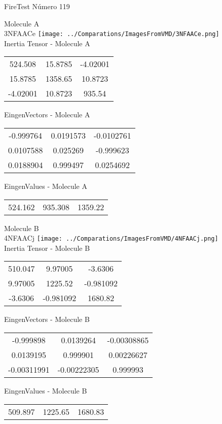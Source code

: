 \vtab[-2cm]
\begin{center}
{\large FireTest \tab Número 119}
\end{center}
\begin{multicols}{2}
\begin{center}

Molecule A \\ 
3NFAACe
\texttt{[image: ../Comparations/ImagesFromVMD/3NFAACe.png]}
\\
Inertia Tensor - Molecule A \\
\vtab

\begin{tabular}{|c c c|}
524.508	 & 	15.8785	 & 	-4.02001	 \\
15.8785	 & 	1358.65	 & 	10.8723	 \\
-4.02001	 & 	10.8723	 & 	935.54
\end{tabular}

\vtab
 EingenVectors - Molecule A     \\
\vtab
\begin{tabular}{|c c c|}
-0.999764	 & 	0.0191573	 & 	-0.0102761	 \\
0.0107588	 & 	0.025269	 & 	-0.999623	 \\
0.0188904	 & 	0.999497	 & 	0.0254692
\end{tabular}

\vtab
 EingenValues - Molecule A     \\
\vtab
\begin{tabular}{|c c c|}
524.162	 & 	935.308	 & 	1359.22	 \\
\end{tabular}
\columnbreak

Molecule B \\ 
4NFAACj
\texttt{[image: ../Comparations/ImagesFromVMD/4NFAACj.png]}
\\
Inertia Tensor - Molecule B \\
\vtab

\begin{tabular}{|c c c|}
510.047	 & 	9.97005	 & 	-3.6306	 \\
9.97005	 & 	1225.52	 & 	-0.981092	 \\
-3.6306	 & 	-0.981092	 & 	1680.82
\end{tabular}

\vtab
 EingenVectors - Molecule B     \\
\vtab
\begin{tabular}{|c c c|}
-0.999898	 & 	0.0139264	 & 	-0.00308865	 \\
0.0139195	 & 	0.999901	 & 	0.00226627	 \\
-0.00311991	 & 	-0.00222305	 & 	0.999993
\end{tabular}

\vtab
 EingenValues - Molecule B     \\
\vtab
\begin{tabular}{|c c c|}
509.897	 & 	1225.65	 & 	1680.83	 \\
\end{tabular}

\end{center}
\end{multicols}

